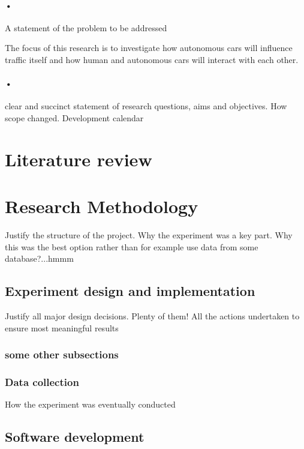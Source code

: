\documentclass[12pt]{article} %
\begin{document}
\paragraph{•}
A statement of the problem to be addressed


The focus of this research is to investigate how autonomous cars will influence traffic
itself and how human and autonomous cars will interact with each other.


\paragraph{•}
clear and succinct statement of research questions, aims and objectives. How scope
changed. Development calendar


\section{Literature review}


\section{Research Methodology}

Justify the structure of the project. Why the experiment was a key part. Why this was
the best option rather than for example use data from some database?...hmmm

\subsection{Experiment design and implementation}


Justify all major design decisions. Plenty of them!
All the actions undertaken to ensure most meaningful results

\subsubsection{some other subsections}

\subsubsection{Data collection}

How the experiment was eventually conducted

\subsection{Software development}
\end{document}
